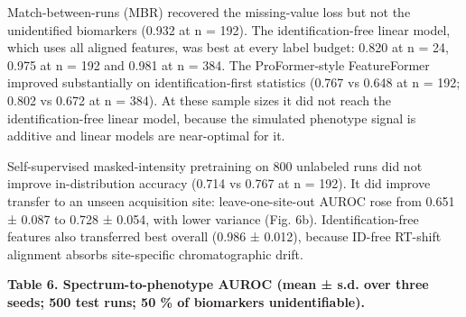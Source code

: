 \documentclass[
]{article}
\begin{document}
Match-between-runs (MBR) recovered the missing-value loss but not the
unidentified biomarkers (0.932 at n = 192). The identification-free
linear model, which uses all aligned features, was best at every label
budget: 0.820 at n = 24, 0.975 at n = 192 and 0.981 at n = 384. The
ProFormer-style FeatureFormer improved substantially on
identification-first statistics (0.767 vs 0.648 at n = 192; 0.802 vs
0.672 at n = 384). At these sample sizes it did not reach the
identification-free linear model, because the simulated phenotype signal
is additive and linear models are near-optimal for it.

Self-supervised masked-intensity pretraining on 800 unlabeled runs did
not improve in-distribution accuracy (0.714 vs 0.767 at n = 192). It did
improve transfer to an unseen acquisition site: leave-one-site-out AUROC
rose from 0.651 ± 0.087 to 0.728 ± 0.054, with lower variance (Fig. 6b).
Identification-free features also transferred best overall (0.986 ±
0.012), because ID-free RT-shift alignment absorbs site-specific
chromatographic drift.

\textbf{Table 6. Spectrum-to-phenotype AUROC (mean ± s.d. over three
seeds; 500 test runs; 50 \% of biomarkers unidentifiable).}
\end{document}
